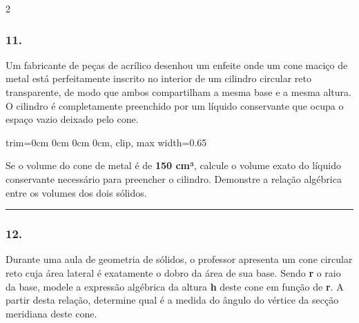 \documentclass[twoside, 10pt, a4paper]{article}
\newlength{\espacoPreQuestao}\setlength{\espacoPreQuestao}{0.1cm}
\newlength{\espacoQuestao}\setlength{\espacoQuestao}{0.2cm}
\newlength{\larguraTikz}
\begin{document}
\begin{multicols*}{2}
\subsubsection*{11.} Um fabricante de peças de acrílico desenhou um enfeite onde um cone maciço de metal está perfeitamente inscrito no interior de um cilindro circular reto transparente, de modo que ambos compartilham a mesma base e a mesma altura. O cilindro é completamente preenchido por um líquido conservante que ocupa o espaço vazio deixado pelo cone.

\begin{center}
\begin{adjustbox}{trim=0cm 0cm 0cm 0cm, clip, max width=0.65\larguraTikz}
\end{adjustbox}
\end{center}

Se o volume do cone de metal é de \textbf{150 cm³}, calcule o volume exato do líquido conservante necessário para preencher o cilindro. Demonstre a relação algébrica entre os volumes dos dois sólidos.
\par\vspace{\espacoQuestao}

\noindent\textcolor{CorLinha}{\rule{\linewidth}{0.5pt}} 
\par\vspace{\espacoPreQuestao}
\subsubsection*{12.} Durante uma aula de geometria de sólidos, o professor apresenta um cone circular reto cuja área lateral é exatamente o dobro da área de sua base. Sendo \textbf{r} o raio da base, modele a expressão algébrica da altura \textbf{h} deste cone em função de \textbf{r}. A partir desta relação, determine qual é a medida do ângulo do vértice da secção meridiana deste cone.
\par\vspace{\espacoQuestao}


\end{multicols*}
\end{document}
